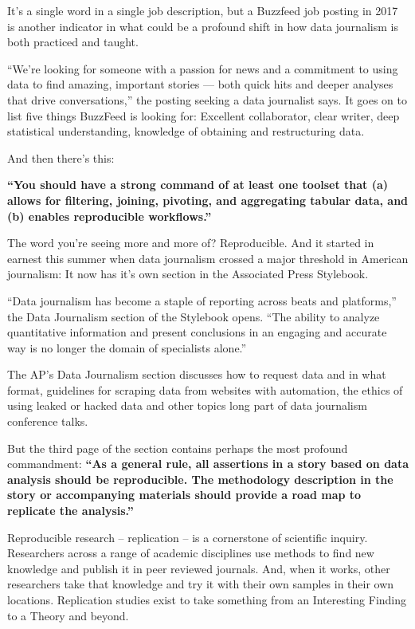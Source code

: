 \documentclass[]{book}
\begin{document}
It's a single word in a single job description, but a Buzzfeed job posting in 2017 is another indicator in what could be a profound shift in how data journalism is both practiced and taught.

``We're looking for someone with a passion for news and a commitment to using data to find amazing, important stories --- both quick hits and deeper analyses that drive conversations,'' the posting seeking a data journalist says. It goes on to list five things BuzzFeed is looking for: Excellent collaborator, clear writer, deep statistical understanding, knowledge of obtaining and restructuring data.

And then there's this:

\textbf{``You should have a strong command of at least one toolset that (a) allows for filtering, joining, pivoting, and aggregating tabular data, and (b) enables reproducible workflows.''}

The word you're seeing more and more of? Reproducible. And it started in earnest this summer when data journalism crossed a major threshold in American journalism: It now has it's own section in the Associated Press Stylebook.

``Data journalism has become a staple of reporting across beats and platforms,'' the Data Journalism section of the Stylebook opens. ``The ability to analyze quantitative information and present conclusions in an engaging and accurate way is no longer the domain of specialists alone.''

The AP's Data Journalism section discusses how to request data and in what format, guidelines for scraping data from websites with automation, the ethics of using leaked or hacked data and other topics long part of data journalism conference talks.

But the third page of the section contains perhaps the most profound commandment: \textbf{``As a general rule, all assertions in a story based on data analysis should be reproducible. The methodology description in the story or accompanying materials should provide a road map to replicate the analysis.''}

Reproducible research -- replication -- is a cornerstone of scientific inquiry. Researchers across a range of academic disciplines use methods to find new knowledge and publish it in peer reviewed journals. And, when it works, other researchers take that knowledge and try it with their own samples in their own locations. Replication studies exist to take something from an Interesting Finding to a Theory and beyond.
\end{document}
